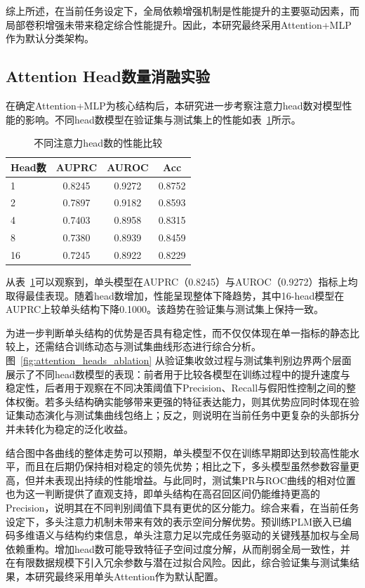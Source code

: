 综上所述，在当前任务设定下，全局依赖增强机制是性能提升的主要驱动因素，而局部卷积增强未带来稳定综合性能提升。因此，本研究最终采用Attention+MLP作为默认分类架构。

\subsection{Attention Head数量消融实验}

在确定Attention+MLP为核心结构后，本研究进一步考察注意力head数对模型性能的影响。不同head数模型在验证集与测试集上的性能如表~\ref{tab:heads}所示。

\begin{table}[htbp]
\centering
\small
\renewcommand{\arraystretch}{1.15}
\caption{不同注意力head数的性能比较}
\label{tab:heads}
\begin{tabular*}{0.72\textwidth}{@{\extracolsep{\fill}}lccc}
\toprule
Head数  & AUPRC & AUROC & Acc \\
\midrule
1 & 0.8245 & 0.9272 & 0.8752 \\
2 & 0.7897 & 0.9182 & 0.8593 \\
4 & 0.7403 & 0.8958 & 0.8315 \\
8 & 0.7380 & 0.8939 & 0.8459 \\
16 & 0.7245 & 0.8922 & 0.8229 \\
\bottomrule
\end{tabular*}
\end{table}
\FloatBarrier

从表~\ref{tab:heads}可以观察到，单头模型在AUPRC（0.8245）与AUROC（0.9272）指标上均取得最佳表现。随着head数增加，性能呈现整体下降趋势，其中16-head模型在AUPRC上较单头结构下降0.1000。该趋势在验证集与测试集上保持一致。

为进一步判断单头结构的优势是否具有稳定性，而不仅仅体现在单一指标的静态比较上，还需结合训练动态与测试集曲线形态进行综合分析。图~\ref{fig:attention_heads_ablation} 从验证集收敛过程与测试集判别边界两个层面展示了不同head数模型的表现：前者用于比较各模型在训练过程中的提升速度与稳定性，后者用于观察在不同决策阈值下Precision、Recall与假阳性控制之间的整体权衡。若多头结构确实能够带来更强的特征表达能力，则其优势应同时体现在验证集动态演化与测试集曲线包络上；反之，则说明在当前任务中更复杂的头部拆分并未转化为稳定的泛化收益。
	
结合图中各曲线的整体走势可以预期，单头模型不仅在训练早期即达到较高性能水平，而且在后期仍保持相对稳定的领先优势；相比之下，多头模型虽然参数容量更高，但并未表现出持续的性能增益。与此同时，测试集PR与ROC曲线的相对位置也为这一判断提供了直观支持，即单头结构在高召回区间仍能维持更高的Precision，说明其在不同判别阈值下具有更优的区分能力。综合来看，在当前任务设定下，多头注意力机制未带来有效的表示空间分解优势。预训练PLM嵌入已编码多维语义与结构约束信息，单头注意力足以完成任务驱动的关键残基加权与全局依赖重构。增加head数可能导致特征子空间过度分解，从而削弱全局一致性，并在有限数据规模下引入冗余参数与潜在过拟合风险。因此，综合验证集与测试集结果，本研究最终采用单头Attention作为默认配置。

